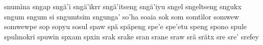snumìna\hspace{2mm}
sngap\hspace{2mm}
sngä'i\hspace{2mm}
sngä'ikrr\hspace{2mm}
sngä'itseng\hspace{2mm}
sngä'iyu\hspace{2mm}
sngel\hspace{2mm}
sngeltseng\hspace{2mm}
sngukx\hspace{2mm}
sngum\hspace{2mm}
sngum si\hspace{2mm}
sngumtsim\hspace{2mm}
sngunga'\hspace{2mm}
so'ha\hspace{2mm}
soaia\hspace{2mm}
sok\hspace{2mm}
som\hspace{2mm}
somtìlor\hspace{2mm}
somwew\hspace{2mm}
somwewpe\hspace{2mm}
sop\hspace{2mm}
sopyu\hspace{2mm}
sosul\hspace{2mm}
spaw\hspace{2mm}
spä\hspace{2mm}
späpeng\hspace{2mm}
spe'e\hspace{2mm}
spe'etu\hspace{2mm}
speng\hspace{2mm}
spono\hspace{2mm}
spule\hspace{2mm}
spulmokri\hspace{2mm}
spuwin\hspace{2mm}
spxam\hspace{2mm}
spxin\hspace{2mm}
srak\hspace{2mm}
srake\hspace{2mm}
sran\hspace{2mm}
srane\hspace{2mm}
sraw\hspace{2mm}
srä\hspace{2mm}
srätx\hspace{2mm}
sre\hspace{2mm}
sre'\hspace{2mm}
srefey\hspace{2mm}
